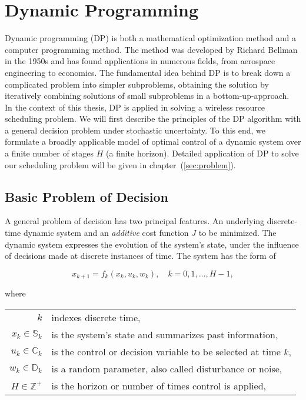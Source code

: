 \section{Dynamic Programming} \label{sec:DP}

Dynamic programming (DP) is both a mathematical optimization method and a
computer programming method. The method was developed by Richard Bellman in the
1950s and has found applications in numerous fields, from aerospace engineering
to economics. The fundamental idea behind DP is to break down a complicated
problem into simpler subproblems, obtaining the solution by iteratively
combining solutions of small subproblems in a bottom-up-approach. \\ In the
context of this thesis, DP is applied in solving a wireless resource scheduling
problem. We will first describe the principles of the DP algorithm with a
general decision problem under stochastic uncertainty. To this end, we formulate
a broadly applicable model of optimal control of a dynamic system over a finite
number of stages $H$ (a finite horizon). Detailed application of DP to solve our
scheduling problem will be given in chapter~(\ref{sec:problem}).

\subsection*{Basic Problem of Decision}
A general problem of decision has two principal features. An underlying
discrete-time dynamic system and an \textit{additive} cost function $J$ to be
minimized. The dynamic system expresses the evolution of the system's state,
under the influence of decisions made at discrete instances of time. The system
has the form of

\begin{equation*}
  x_{k+1} = f_k(x_k, u_k, w_k), \quad k = 0,1,\dots,H-1,
\end{equation*}

where

\begin{table}[h]
  \centering
  \begin{tabular}{rl}
    $k$ & indexes discrete time, \\
    $x_k \in \mathbb{S}_k$  & is the system's state and summarizes past information, \\
    $u_k \in \mathbb{C}_k$ & is the control or decision variable to be selected at time $k$, \\
    $w_k \in \mathbb{D}_k$ & is a random parameter, also called disturbance or noise, \\
    $H \in \mathbb{Z}^+$ & is the horizon or number of times control is applied, 
  \end{tabular}
\end{table}

